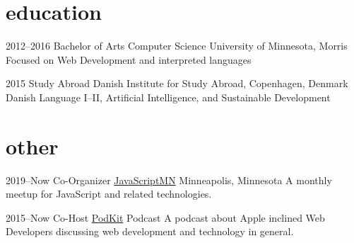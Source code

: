 \documentclass[]{cv-style} %
\begin{document}

\section{education}

\begin{entrylist}


\entry
{2012--2016}
{Bachelor of Arts {\normalfont Computer Science}}
{University of Minnesota, Morris}
{\small{Focused on Web Development and interpreted languages}}

\entry
{2015}
{Study Abroad}
{Danish Institute for Study Abroad, Copenhagen, Denmark}
{\small{Danish Language I--II, Artificial Intelligence, and Sustainable Development}}


\end{entrylist}


\section{other}

\begin{entrylist}


\entry
{2019--Now}
{Co-Organizer {\normalfont \href{https://javascriptmn.com}{JavaScriptMN}}}
{Minneapolis, Minnesota}
{A monthly meetup for JavaScript and related technologies.}


\entry
{2015--Now}
{Co-Host {\normalfont \href{http://thenexus.tv/category/pk/}{PodKit}}}
{Podcast}
{A podcast about Apple inclined Web Developers discussing web development and technology in general.}


\end{entrylist}


%
%
%
%
%
\end{document}
